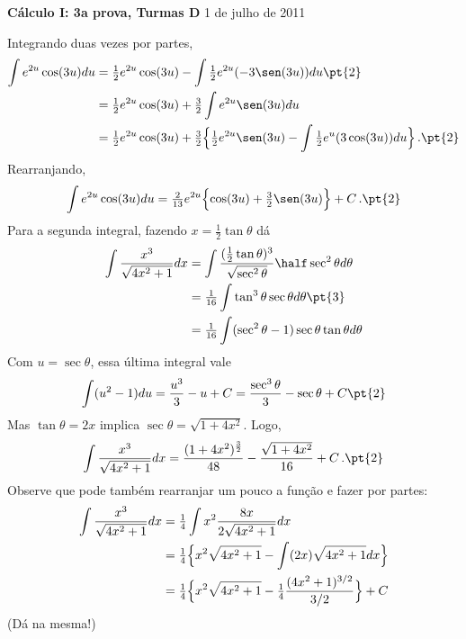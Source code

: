 {\footnotesize
{\bf C\'alculo I: 3a prova, Turmas D}
\hfill 1 de julho de 2011
\vspace{2pt}
\begin{enumerate}

 {
Integrando duas vezes por partes, 
\begin{align*}
 \int e^{2u}\cos (3u)du&=\tfrac12 e^{2u}\cos (3u)-\int \tfrac12 e^{2u}(-3\sen (3u))du\pt{2}\\
&=\tfrac12 e^{2u}\cos (3u)+\tfrac32 \int  e^{2u}\sen (3u)du\\
&=\tfrac12 e^{2u}\cos (3u)+\tfrac32\Big\{\tfrac12 e^{2u}\sen (3u)-\int \tfrac12 e^u(3\cos (3u))du \Big\}\,.\pt{2}
\end{align*}
Rearranjando, 
$$
\int e^{2u}\cos (3u)du=\tfrac{2}{13}e^{2u}\Bigl\{\cos (3u)+\tfrac{3}{2}\sen (3u)\Bigr\}+C\,.\pt{2}
$$
Para a segunda integral, fazendo $x=\tfrac12\tan \theta$ dá
\begin{align*}
 \int \frac{x^3}{\sqrt{4x^2+1}}dx&=\int \frac{(\tfrac12 \tan \theta)^3}{\sqrt{\sec^2\theta}}
\half\sec^2\theta d\theta\\
&=\tfrac{1}{16} \int\tan^3\theta \sec\theta d\theta\pt{3}\\
&=\tfrac{1}{16} \int (\sec^2\theta-1)\sec\theta \tan\theta d\theta
\end{align*}
Com $u=\sec \theta$, essa última integral vale 
$$
\int (u^2-1)du=\frac{u^3}{3}-u+C=
\frac{\sec^3\theta}{3}-{\sec\theta}+C\pt{2}
$$
Mas $\tan \theta=2x$ implica $\sec \theta=\sqrt{1+4x^2}$. Logo,
$$
\int \frac{x^3}{\sqrt{4x^2+1}}dx=\frac{(1+4x^2)^{\frac{3}{2}}}{48}
-\frac{\sqrt{1+4x^2}}{16}+C\,.\pt{2}
$$
Observe que pode também rearranjar um pouco a função e fazer por partes:
\begin{align*}
 \int \frac{x^3}{\sqrt{4x^2+1}}dx&=
 \tfrac14\int x^2\frac{8x}{2\sqrt{4x^2+1}}dx\\
&=\tfrac14\Bigl\{x^2\sqrt{4x^2+1}-\int (2x)\sqrt{4x^2+1}dx\Bigr\}\\
&=\tfrac14\Bigl\{x^2\sqrt{4x^2+1}-\tfrac14\frac{(4x^2+1)^{3/2}}{3/2}\Bigr\}+C
\end{align*}
(Dá na mesma!)
}




\end{enumerate}}
